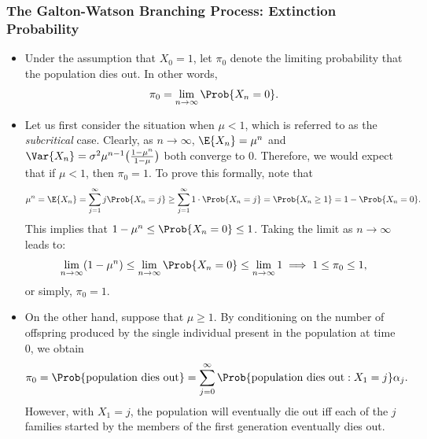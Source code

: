 \subsubsection{The Galton-Watson Branching Process: Extinction Probability}
\begin{itemize}
    \item Under the assumption that $ X_0=1 $, let $ \pi_0 $ denote the limiting probability that the population dies out.
          In other words,
          \[ \pi_0=\lim\limits_{{n} \to {\infty}} \Prob{X_n=0}. \]
    \item Let us first consider the situation when $ \mu<1 $, which is referred to as the \emph{subcritical} case.
          Clearly, as $ n\to\infty $, $ \E{X_n}=\mu^n $ and $ \Var{X_n}=\sigma^2\mu^{n-1}\bigl(\frac{1-\mu^n}{1-\mu}\bigr) $ both converge to $ 0 $.
          Therefore, we would expect that if $ \mu<1 $, then $ \pi_0=1 $. To prove this formally, note that
          \[ \mu^n=\E{X_n}=\sum_{j=1}^{\infty} j\Prob{X_n=j}\ge \sum_{j=1}^{\infty} 1\cdot \Prob{X_n=j}=\Prob{X_n\ge 1}=1-\Prob{X_n=0}. \]
          This implies that $ 1-\mu^n\le \Prob{X_n=0}\le 1 $. Taking the limit as $ n\to\infty $ leads to:
          \[ \lim\limits_{{n} \to {\infty}} (1-\mu^n)\le \lim\limits_{{n} \to {\infty}} \Prob{X_n=0}\le \lim\limits_{{n} \to {\infty}} 1\implies 1\le \pi_0\le 1, \]
          or simply, $ \pi_0=1 $.
    \item On the other hand, suppose that $ \mu\ge 1 $. By conditioning on the number of offspring produced
          by the single individual present in the population at time $0$, we obtain
          \[ \pi_0=\Prob{\text{population dies out}}=\sum_{j=0}^{\infty} \Prob{\text{population dies out}\given X_1=j}\alpha_j. \]
          However, with $ X_1=j $, the population will eventually die out iff each of the $j$ families started
          by the members of the first generation eventually dies out.


\end{itemize}
